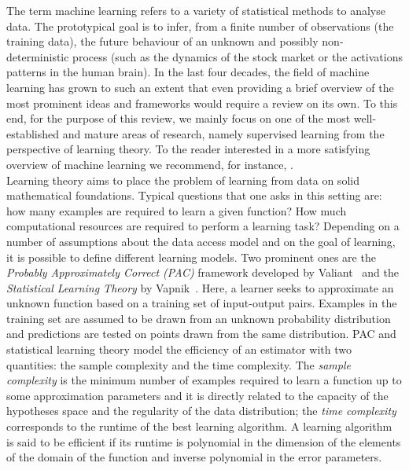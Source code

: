 \documentclass[a4paper, 11pt]{article}
\begin{document}
The term machine learning refers to a variety of statistical methods to analyse data. The prototypical goal is to infer, from a finite number of observations (the training data), the future behaviour of an unknown and possibly non-deterministic process (such as the dynamics of the stock market or the activations patterns in the human brain). In the last four decades, the field of machine learning has grown to such an extent that even providing a brief overview of the most prominent ideas and frameworks would require a review on its own. To this end, for the purpose of this review, we mainly focus on one of the most well-established and mature areas of research, namely supervised learning from the perspective of learning theory. To the reader interested in a more satisfying overview of machine learning we recommend, for instance, \cite{murphy2012machine}.\\

Learning theory aims to place the problem of learning from data on solid mathematical foundations. Typical questions that one asks in this setting are: how many examples are required to learn a given function? How much computational resources are required to perform a learning task? Depending on a number of assumptions about the data access model and on the goal of learning, it is possible to define different learning models. Two prominent ones are the {\em Probably Approximately Correct (PAC)} framework developed by Valiant~\cite{valiant1984theory} and the {\em Statistical Learning Theory} by Vapnik~\cite{vapnik1998}. Here, a learner seeks to approximate an unknown function based on a training set of input-output pairs. Examples in the training set are assumed to be drawn from an unknown probability distribution and predictions are tested on points drawn from the same distribution. PAC and statistical learning theory model the efficiency of an estimator with two quantities: the sample complexity and the time complexity. The \textit{sample complexity} is the minimum number of examples required to learn a function up to some approximation parameters and it is directly related to the capacity of the hypotheses space and the regularity of the data distribution; the \textit{time complexity} corresponds to the runtime of the best learning algorithm. A learning algorithm is said to be efficient if its runtime is polynomial in the dimension of the elements of the domain of the function and inverse polynomial in the error parameters.\\    
\end{document}
